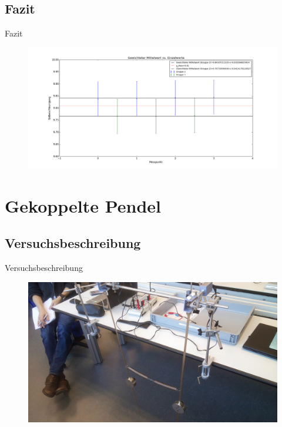 \documentclass[11pt]{beamer}
\begin{document}
\subsection{Fazit}
\begin{frame}{Fazit}
\begin{figure}[H]
\includegraphics[scale=0.25]{Bilder/Erdbeschleunigung_alle_besserer_fehler.png}
\end{figure}
\end{frame}


\section{Gekoppelte Pendel}
\subsection{Versuchsbeschreibung}
\begin{frame}{Versuchsbeschreibung}
\begin{figure}[H]
\centering
\includegraphics[scale=0.065]{Bilder/gekoppelt.jpg}
\end{figure}
\end{frame}
\end{document}
